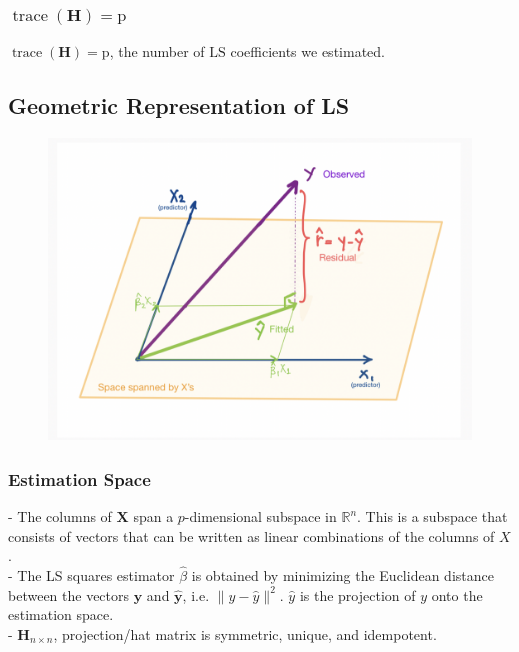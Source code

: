 \documentclass[11pt,a4paper]{article}
\begin{document}
\subsubsection{$\operatorname{trace}(\mathbf{H})=\mathrm{p}$}
$\operatorname{trace}(\mathbf{H})=\mathrm{p}$, the number of $\mathrm{LS}$ coefficients we estimated.

\subsection{Geometric Representation of LS}
\begin{center}\begin{figure}[htbp]
    \centering
    \includegraphics[scale=0.5]{截屏2021-09-05 22.22.04.png}
    \caption{}
    \label{}
\end{figure}\end{center}
\subsubsection{Estimation Space}
- The columns of $\mathbf{X}$ span a $p$-dimensional subspace in $\mathbb{R}^{n}$. This is a subspace that consists of vectors that can be written as linear combinations of the columns of $X$.\\
- The LS squares estimator $\hat{\beta}$ is obtained by minimizing the Euclidean distance between the vectors $\mathbf{y}$ and $\hat{\mathbf{y}}$, i.e. $\|y-\hat{y}\|^{2}$. $\hat{y}$ is the projection of $y$ onto the estimation space.\\
- $\mathbf{H}_{n \times n}$, projection/hat matrix is symmetric, unique, and idempotent.\\
\end{document}
